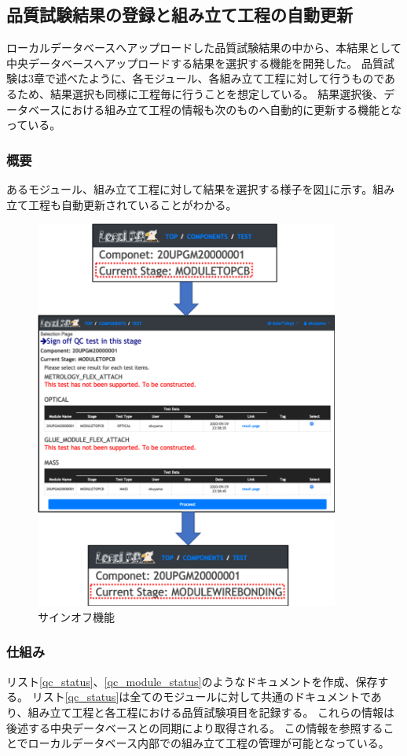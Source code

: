 \newpage
\subsection{品質試験結果の登録と組み立て工程の自動更新}
ローカルデータベースへアップロードした品質試験結果の中から、本結果として中央データベースへアップロードする結果を選択する機能を開発した。
品質試験は3章で述べたように、各モジュール、各組み立て工程に対して行うものであるため、結果選択も同様に工程毎に行うことを想定している。
結果選択後、データベースにおける組み立て工程の情報も次のものへ自動的に更新する機能となっている。

\subsubsection{概要}
あるモジュール、組み立て工程に対して結果を選択する様子を図\ref{webapp_sign_off}に示す。組み立て工程も自動更新されていることがわかる。

\begin{figure}[bpt]\centering
\includegraphics[width=10cm]{webapp_sign_off}
\caption[サインオフ機能]{サインオフ機能}
\label{webapp_sign_off}
\end{figure}

\newpage
\subsubsection{仕組み}
リスト\ref{qc_status}、\ref{qc_module_status}のようなドキュメントを作成、保存する。
リスト\ref{qc_status}は全てのモジュールに対して共通のドキュメントであり、組み立て工程と各工程における品質試験項目を記録する。
これらの情報は後述する中央データベースとの同期により取得される。
この情報を参照することでローカルデータベース内部での組み立て工程の管理が可能となっている。

